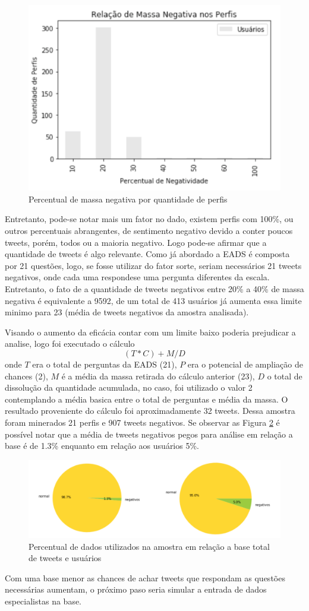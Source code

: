 \begin{figure}[!ht]
    \centering
    \includegraphics[width=.4\textwidth]{imagens/relacao-massa-neg.png}
    \caption{Percentual de massa negativa por quantidade de perfis}
    \label{fig:negative-pop-relation}
\end{figure}

Entretanto, pode-se notar mais um fator no dado, existem perfis com 100\%, ou outros percentuais abrangentes, de sentimento negativo devido a conter poucos tweets, porém, todos ou a maioria negativo. Logo pode-se afirmar que a quantidade de tweets é algo relevante. Como já abordado a EADS é composta por 21 questões, logo, se fosse utilizar do fator sorte, seriam necessários 21 tweets negativos, onde cada uma respondese uma pergunta diferentes da escala. Entretanto, o fato de a quantidade de tweets negativos entre 20\% a 40\% de massa negativa é equivalente a 9592, de um total de 413 usuários já aumenta essa limite minimo para 23 (média de tweets negativos da amostra analisada). 

Visando o aumento da eficácia contar com um limite baixo poderia prejudicar a analise, logo foi executado o cálculo \[ (T * C) + M / D \] onde \(T\) era o total de perguntas da EADS (21), \(P\) era o potencial de ampliação de chances (2), \(M\) é a média da massa retirada do cálculo anterior (23), \(D\) o total de dissolução da quantidade acumulada, no caso, foi utilizado o valor 2 contemplando a média basica entre o total de perguntas e média da massa. O resultado proveniente do cálculo foi aproximadamente 32 tweets. Dessa amostra foram minerados 21 perfis e 907 tweets negativos. Se observar as Figura \ref{fig:sample-relation} é possível notar que a média de tweets negativos pegos para análise em relação a base é de 1.3\% enquanto em relação aos usuários 5\%.

\begin{figure}[!ht]
    \centering
    \includegraphics[width=.6\textwidth]{imagens/relacao-amostra.png}
    \caption{Percentual de dados utilizados na amostra em relação a base total de tweets e usuários}
    \label{fig:sample-relation}
\end{figure}

Com uma base menor as chances de achar tweets que respondam as questões necessárias aumentam, o próximo paso seria simular a entrada de dados especialistas na base.

